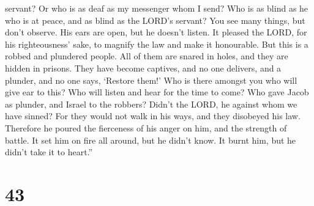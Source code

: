 servant? Or who is as deaf as my messenger whom I send? Who is as blind
as he who is at peace, and as blind as the LORD's servant? 
You see many things, but don't observe. His ears are open, but he
doesn't listen.  It pleased the LORD, for his
righteousness' sake, to magnify the law and make it honourable.
 But this is a robbed and plundered people. All of them are
snared in holes, and they are hidden in prisons. They have become
captives, and no one delivers, and a plunder, and no one says, `Restore
them!'  Who is there amongst you who will give ear to this?
Who will listen and hear for the time to come?  Who gave
Jacob as plunder, and Israel to the robbers? Didn't the LORD, he against
whom we have sinned? For they would not walk in his ways, and they
disobeyed his law.  Therefore he poured the fierceness of
his anger on him, and the strength of battle. It set him on fire all
around, but he didn't know. It burnt him, but he didn't take it to
heart.''

\hypertarget{section-42}{%
\section{43}\label{section-42}}

